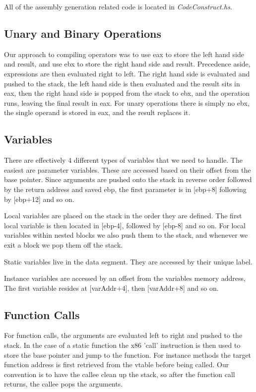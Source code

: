 \documentclass[12pt,letterpaper]{article}
\begin{document}
All of the assembly generation related code is located in \emph{CodeConstruct.hs}.

\subsection{Unary and Binary Operations}
Our approach to compiling operators was to use eax to store the left hand side and result, and use ebx to store the right hand side and result.
Precedence aside, expressions are then evaluated right to left.
The right hand side is evaluated and pushed to the stack, the left hand side is then evaluated and the result sits in eax, then the right hand side is popped from the stack to ebx, and the operation runs, leaving the final result in eax.
For unary operations there is simply no ebx, the single operand is stored in eax, and the result replaces it.

\subsection{Variables}
There are effectively 4 different types of variables that we need to handle.
The easiest are parameter variables. These are accessed based on their offset from the base pointer.
Since arguments are pushed onto the stack in reverse order followed by the return address and saved ebp, the first parameter is in [ebp+8] following by [ebp+12] and so on.

Local variables are placed on the stack in the order they are defined. The first local variable is then located in [ebp-4], followed by [ebp-8] and so on.
For local variables within nested blocks we also push them to the stack, and whenever we exit a block we pop them off the stack.

Static variables live in the data segment. They are accessed by their unique label.

Instance variables are accessed by an offset from the variables memory address, The first variable resides at [varAddr+4], then [varAddr+8] and so on.

\subsection{Function Calls}
For function calls, the arguments are evaluated left to right and pushed to the stack.
In the case of a static function the x86 'call' instruction is then used to store the base pointer and jump to the function.
For instance methods the target function address is first retrieved from the vtable before being called.
Our convention is to have the callee clean up the stack, so after the function call returns, the callee pops the arguments.
\end{document}
